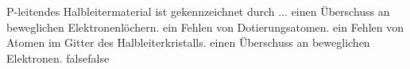     {P-leitendes Halbleitermaterial ist gekennzeichnet durch ...}
    {einen Überschuss an beweglichen Elektronenlöchern.}
    {ein Fehlen von Dotierungsatomen.}
    {ein Fehlen von Atomen im Gitter des Halbleiterkristalls.}
    {einen Überschuss an beweglichen Elektronen.}
    {false}{false}